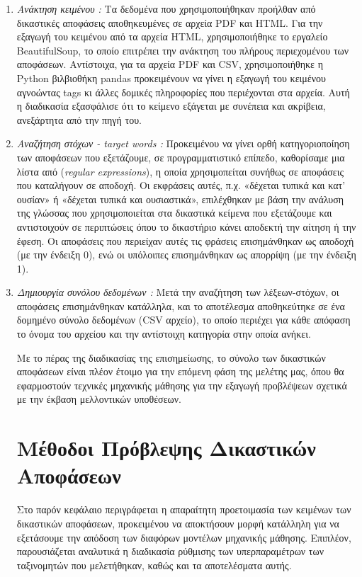 \documentclass[diploma]{softlab-thesis}
\begin{document}
\begin{enumerate}
\begin{enumerate}
\item \textit{Ανάκτηση κειμένου :} Τα δεδομένα που χρησιμοποιήθηκαν προήλθαν από δικαστικές αποφάσεις αποθηκευμένες σε αρχεία PDF και HTML. Για την εξαγωγή του κειμένου από τα αρχεία HTML, χρησιμοποιήθηκε το εργαλείο BeautifulSoup, το οποίο επιτρέπει την ανάκτηση του πλήρους περιεχομένου των αποφάσεων. Αντίστοιχα, για τα αρχεία PDF και CSV, χρησιμοποιήθηκε η Python βιλβιοθήκη pandas προκειμένουν να γίνει η εξαγωγή του κειμένου αγνοώντας tags κι άλλες δομικές πληροφορίες που περιέχονται στα αρχεία. Αυτή η διαδικασία εξασφάλισε ότι το κείμενο εξάγεται με συνέπεια και ακρίβεια, ανεξάρτητα από την πηγή του.
\item \textit{Αναζήτηση στόχων - target words :} Προκειμένου να γίνει ορθή κατηγοριοποίηση των αποφάσεων που εξετάζουμε, σε προγραμματιστικό επίπεδο, καθορίσαμε μια λίστα από (\textit{regular expressions}), η οποία χρησιμοπείται συνήθως σε αποφάσεις που καταλήγουν σε αποδοχή. Οι εκφράσεις αυτές, π.χ. «δέχεται τυπικά και κατ’ ουσίαν» ή «δέχεται τυπικά και ουσιαστικά», επιλέχθηκαν με βάση την ανάλυση της γλώσσας που χρησιμοποιείται στα δικαστικά κείμενα που εξετάζουμε και αντιστοιχούν σε περιπτώσεις όπου το δικαστήριο κάνει αποδεκτή την αίτηση ή την έφεση. Οι αποφάσεις που περιείχαν αυτές τις φράσεις επισημάνθηκαν ως αποδοχή (με την ένδειξη 0), ενώ οι υπόλοιπες επισημάνθηκαν ως απορρίψη (με την ένδειξη 1).
\item \textit{Δημιουργία συνόλου δεδομένων :} Μετά την αναζήτηση των λέξεων-στόχων, οι αποφάσεις επισημάνθηκαν κατάλληλα, και το αποτέλεσμα αποθηκεύτηκε σε ένα δομημένο σύνολο δεδομένων (CSV αρχείο), το οποίο περιέχει για κάθε απόφαση το όνομα του αρχείου και την αντίστοιχη κατηγορία στην οποία ανήκει.


Με το πέρας της διαδικασίας της επισημείωσης, το σύνολο των δικαστικών αποφάσεων είναι πλέον έτοιμο για την επόμενη φάση της μελέτης μας, όπου θα εφαρμοστούν τεχνικές μηχανικής μάθησης για την εξαγωγή προβλέψεων σχετικά με την έκβαση μελλοντικών υποθέσεων.

 
\chapter{Μέθοδοι Πρόβλεψης Δικαστικών Αποφάσεων}

Στο παρόν κεφάλαιο περιγράφεται η απαραίτητη προετοιμασία των κειμένων των δικαστικών αποφάσεων, προκειμένου να αποκτήσουν μορφή κατάλληλη για να εξετάσουμε την απόδοση των διαφόρων μοντέλων μηχανικής μάθησης. Επιπλέον, παρουσιάζεται αναλυτικά η διαδικασία ρύθμισης των υπερπαραμέτρων των ταξινομητών που μελετήθηκαν, καθώς και τα αποτελέσματα αυτής. 


\end{enumerate}
\end{enumerate}
\end{document}
